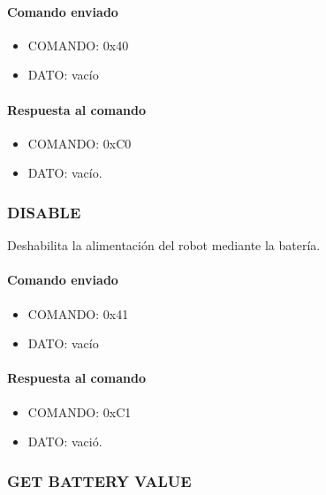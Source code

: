 \paragraph*{Comando enviado}

\begin{itemize}
	\item{COMANDO:} 0x40
	\item{DATO:} vac\'io
\end{itemize}

\paragraph*{Respuesta al comando}

\begin{itemize}
	\item{COMANDO:} 0xC0
	\item{DATO:} vac\'io.

\end{itemize}

\subsubsection{DISABLE}
\label{hA_protocolo_get_battery_value}

Deshabilita la alimentaci\'on del robot mediante la bater\'ia.

\paragraph*{Comando enviado}

\begin{itemize}
	\item{COMANDO:} 0x41
	\item{DATO:} vac\'io
\end{itemize}

\paragraph*{Respuesta al comando}

\begin{itemize}
	\item{COMANDO:} 0xC1
	\item{DATO:} vaci\'o.

\end{itemize}

\subsubsection{GET BATTERY VALUE}
\label{hA_protocolo_get_battery_value}

